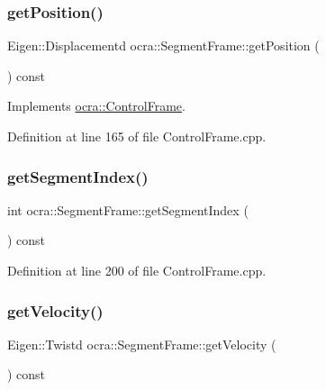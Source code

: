 \subsubsection{\texorpdfstring{get\+Position()}{getPosition()}}
{\footnotesize\ttfamily Eigen\+::\+Displacementd ocra\+::\+Segment\+Frame\+::get\+Position (\begin{DoxyParamCaption}{ }\end{DoxyParamCaption}) const\hspace{0.3cm}{\ttfamily [virtual]}}



Implements \hyperlink{classocra_1_1ControlFrame_aaadbbfbcdd5b8e197a0f181ffb2fdcbe}{ocra\+::\+Control\+Frame}.



Definition at line 165 of file Control\+Frame.\+cpp.

\hypertarget{classocra_1_1SegmentFrame_a8f651dccb13afc25504531efd17c8eef}{}\label{classocra_1_1SegmentFrame_a8f651dccb13afc25504531efd17c8eef} 
\subsubsection{\texorpdfstring{get\+Segment\+Index()}{getSegmentIndex()}}
{\footnotesize\ttfamily int ocra\+::\+Segment\+Frame\+::get\+Segment\+Index (\begin{DoxyParamCaption}{ }\end{DoxyParamCaption}) const}



Definition at line 200 of file Control\+Frame.\+cpp.

\hypertarget{classocra_1_1SegmentFrame_a6a45d4901408704ead9bbd1f5b99a666}{}\label{classocra_1_1SegmentFrame_a6a45d4901408704ead9bbd1f5b99a666} 
\subsubsection{\texorpdfstring{get\+Velocity()}{getVelocity()}}
{\footnotesize\ttfamily Eigen\+::\+Twistd ocra\+::\+Segment\+Frame\+::get\+Velocity (\begin{DoxyParamCaption}{ }\end{DoxyParamCaption}) const\hspace{0.3cm}{\ttfamily [virtual]}}



